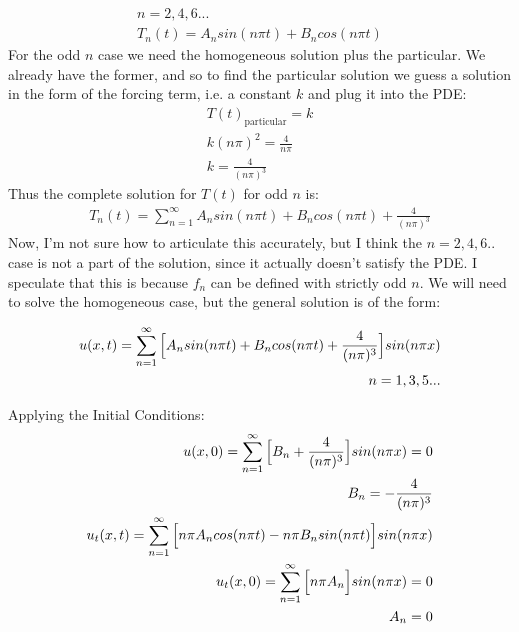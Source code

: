 \documentclass{article}
\begin{document}
\begin{equation}
\begin{aligned}
n = 2,4,6...\\
T_n(t) = A_n sin(n\pi t) + B_n cos(n\pi t)
\end{aligned}
\end{equation}
For the odd $n$ case we need the homogeneous solution plus the particular. We already have the former, and so to find the particular solution we guess a solution in the form of the forcing term, i.e. a constant $k$ and plug it into the PDE:
\begin{equation}
\begin{aligned}
T(t)_{\text{particular}} = k\\
k(n\pi)^2= \frac{4}{n\pi}\\
k = \frac{4}{(n\pi)^3}
\end{aligned}
\end{equation}
Thus the complete solution for $T(t)$ for odd $n$ is:
\begin{equation}
\begin{aligned}
T_n(t) = \sum_{n=1}^{\infty}A_n sin(n\pi t) + B_n cos(n\pi t) + \frac{4}{(n\pi)^3}
\end{aligned}
\end{equation}
Now, I'm not sure how to articulate this accurately, but I think the $n=2,4,6..$ case is not a part of the solution, since it actually doesn't satisfy the PDE. I speculate that this is because $f_n$ can be defined with strictly odd $n$. We will need to solve the homogeneous case, but the general solution is of the form:
\begin{tcolorbox}[minipage,colback=white,arc=0pt,outer arc=0pt]
\begin{equation}
\begin{aligned}
u(x,t) = \sum_{n=1}^{\infty} \Big{[} A_n sin(n\pi t) + B_n cos(n\pi t) +\frac{4}{(n\pi)^3} \Big{]}sin(n\pi x)\\
n = 1,3,5...
\end{aligned}
\end{equation}
\end{tcolorbox}
Applying the Initial Conditions:
\begin{equation}
\begin{aligned}
u(x,0) = \sum_{n=1}^{\infty} \Big{[}B_n + \frac{4}{(n\pi)^3}\Big{]}sin(n\pi x) = 0\\
B_n = -\frac{4}{(n\pi)^3}\\
u_t(x,t) = \sum_{n=1}^{\infty} \Big{[} n\pi A_n cos(n\pi t) - n\pi B_n sin(n\pi t) \Big{]}sin(n\pi x)\\
u_t(x,0) = \sum_{n=1}^{\infty}\Big{[}n\pi A_n \Big{]}sin(n\pi x) = 0\\
A_n = 0
\end{aligned}
\end{equation}
\end{document}
